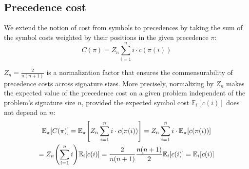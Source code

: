 \subsection{Precedence cost}


We extend the notion of cost from symbols to precedences
by taking the sum of the symbol costs
weighted by their positions in the given precedence $\pi$:
\begin{equation*} \label{eq:cost_model}
C(\pi) = Z_n \sum_{i=1}^n i \cdot c(\pi(i))%
\end{equation*}

$Z_n = \frac{2}{n(n+1)}$ is a normalization factor
that ensures the commensurability of precedence costs across signature sizes.
More precisely, normalizing by $Z_n$ makes the expected value of the precedence cost on a given problem
independent of the problem's signature size $n$,
provided the expected symbol cost $\mathbb{E}_i [c(i)]$ does not depend on $n$:
\begin{multline*}
\mathbb{E}_\pi [C(\pi)]
= \mathbb{E}_\pi \SquareBracket*{Z_n \sum_{i=1}^n i \cdot c(\pi(i))}
= Z_n \sum_{i=1}^n i \cdot \mathbb{E}_\pi [c(\pi(i))] \\
= Z_n \Parentheses*{\sum_{i=1}^n i} \mathbb{E}_i [c(i)]
= \frac{2}{n(n+1)} \frac{n(n+1)}{2} \mathbb{E}_i [c(i)]
= \mathbb{E}_i [c(i)]
\end{multline*}

